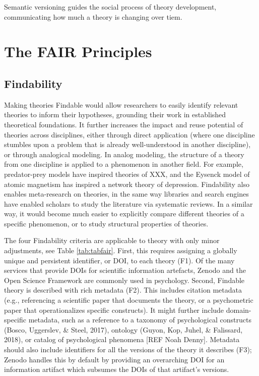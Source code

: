 \documentclass[
  man,floatsintext]{apa6}
\begin{document}
Semantic versioning guides the social process of theory development, communicating how much a theory is changing over tiem.

\section{The FAIR Principles}\label{the-fair-principles}

\subsection{Findability}\label{findability}

Making theories Findable would allow researchers to easily identify relevant theories to inform their hypotheses,
grounding their work in established theoretical foundations.
It further increases the impact and reuse potential of theories across disciplines,
either through direct application (where one discipline stumbles upon a problem that is already well-understood in another discipline),
or through analogical modeling.
In analog modeling, the structure of a theory from one discipline is applied to a phenomenon in another field.
For example, predator-prey models have inspired theories of XXX, and the Eysenck model of atomic magnetism has inspired a network theory of depression.
Findability also enables meta-research on theories,
in the same way libraries and search engines have enabled scholars to study the literature via systematic reviews.
In a similar way, it would become much easier to explicitly compare different theories of a specific phenomenon,
or to study structural properties of theories.

The four Findability criteria are applicable to theory with only minor adjustments, see Table \ref{tab:tabfair}.
First, this requires assigning a globally unique and persistent identifier, or DOI, to each theory (F1).
Of the many services that provide DOIs for scientific information artefacts,
Zenodo and the Open Science Framework are commonly used in psychology.
Second, Findable theory is described with rich metadata (F2).
This includes citation metadata (e.g., referencing a scientific paper that documents the theory, or a psychometric paper that operationalizes specific constructs).
It might further include domain-specific metadata, such as a reference to a taxonomy of psychological constructs (Bosco, Uggerslev, \& Steel, 2017),
ontology (Guyon, Kop, Juhel, \& Falissard, 2018),
or catalog of psychological phenomena {[}REF Noah Denny{]}.
Metadata should also include identifiers for all the versions of the theory it describes (F3);
Zenodo handles this by default by providing an overarching DOI for an information artifact which subsumes the DOIs of that artifact's versions.
\end{document}
